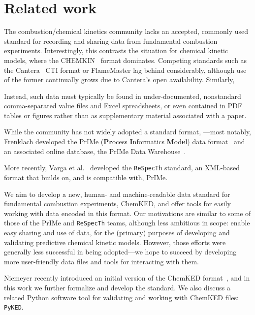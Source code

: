\documentclass[12pt]{ussci}
\newcommand\ck{ChemKED}
\newcommand\pk{\texttt{PyKED}}
\begin{document}
\section{Related work}
%

The combustion\slash chemical kinetics community lacks an accepted, commonly used
standard for recording and sharing data from fundamental combustion experiments.
Interestingly, this contrasts the situation for chemical kinetic models, where the
CHEMKIN~\cite{Kee:1996ck} format dominates. Competing standards such as the
Cantera~\cite{Cantera:2.3.0} CTI format or FlameMaster lag behind considerably, although
use of the former continually grows due to Cantera's open availability.
Similarly, 

Instead, such data must typically be found in under-documented, nonstandard comma-separated value
files and Excel spreadsheets, or even contained in PDF tables or figures rather than as
supplementary material associated with a paper.

While the community has not widely adopted a standard format,
---most notably, Frenklach developed the PrIMe (\textbf{Pr}ocess \textbf{I}nformatics
\textbf{M}od\textbf{e}l) data format~\cite{Frenklach:2007bm,You:2011hy} and an associated
online database, the PrIMe Data Warehouse~\cite{PrIMe}.

More recently, Varga et al.~\cite{Varga2015a,Varga2015b} developed the \texttt{ReSpecTh} standard,
an XML-based format that builds on, and is compatible with, PrIMe.

We aim to develop a new, human- and machine-readable data standard for fundamental combustion
experiments, \ck{}, and offer tools for easily working with data encoded in this format.
Our motivations are similar to some of those of the PrIMe and \texttt{ReSpecTh} teams, although
less ambitious in scope: enable easy sharing and use of data, for the (primary) purposes of
developing and validating predictive chemical kinetic models.
However, those efforts were generally less successful in being adopted---we hope to succeed
by developing more user-friendly data files and tools for interacting with them.

Niemeyer recently introduced an initial version of the \ck{} format~\cite{Niemeyer:2016wf},
and in this work we further formalize and develop the standard. We also discuss a related
Python software tool for validating and working with \ck{} files: \pk{}.
\end{document}
